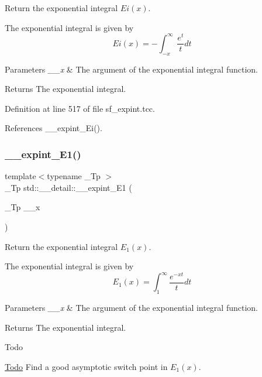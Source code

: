 Return the exponential integral $ Ei(x) $. 

The exponential integral is given by \[ Ei(x) = -\int_{-x}^\infty \frac{e^t}{t} dt \]


\begin{DoxyParams}{Parameters}
{\em \+\_\+\+\_\+x} & The argument of the exponential integral function. \\
\hline
\end{DoxyParams}
\begin{DoxyReturn}{Returns}
The exponential integral. 
\end{DoxyReturn}


Definition at line 517 of file sf\+\_\+expint.\+tcc.



References \+\_\+\+\_\+expint\+\_\+\+Ei().

\mbox{\label{namespacestd_1_1____detail_a665eb0c524b929c035d88bbb17815917}} 
\subsubsection{\texorpdfstring{\+\_\+\+\_\+expint\+\_\+\+E1()}{\_\_expint\_E1()}}
{\footnotesize\ttfamily template$<$typename \+\_\+\+Tp $>$ \\
\+\_\+\+Tp std\+::\+\_\+\+\_\+detail\+::\+\_\+\+\_\+expint\+\_\+\+E1 (\begin{DoxyParamCaption}\item[{\+\_\+\+Tp}]{\+\_\+\+\_\+x }\end{DoxyParamCaption})}



Return the exponential integral $ E_1(x) $. 

The exponential integral is given by \[ E_1(x) = \int_{1}^\infty \frac{e^{-xt}}{t} dt \]


\begin{DoxyParams}{Parameters}
{\em \+\_\+\+\_\+x} & The argument of the exponential integral function. \\
\hline
\end{DoxyParams}
\begin{DoxyReturn}{Returns}
The exponential integral. 
\end{DoxyReturn}
\begin{DoxyRefDesc}{Todo}
\item[\hyperlink{todo__todo000010}{Todo}]Find a good asymptotic switch point in $ E_1(x) $. \end{DoxyRefDesc}


